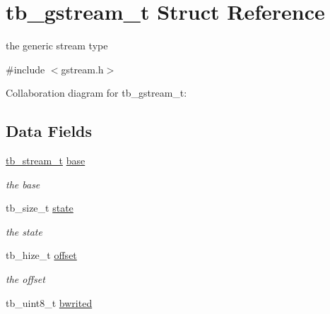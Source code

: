\hypertarget{structtb__gstream__t}{\section{tb\-\_\-gstream\-\_\-t Struct Reference}
\label{structtb__gstream__t}
}


the generic stream type  




{\ttfamily \#include $<$gstream.\-h$>$}



Collaboration diagram for tb\-\_\-gstream\-\_\-t\-:
\subsection*{Data Fields}
\begin{DoxyCompactItemize}
\item 
\hypertarget{structtb__gstream__t_a7da52e3f128e13ef5c83b011913e1a86}{\hyperlink{structtb__stream__t}{tb\-\_\-stream\-\_\-t} \hyperlink{structtb__gstream__t_a7da52e3f128e13ef5c83b011913e1a86}{base}}\label{structtb__gstream__t_a7da52e3f128e13ef5c83b011913e1a86}

\begin{DoxyCompactList}\small\item\em the base \end{DoxyCompactList}\item 
\hypertarget{structtb__gstream__t_af60ad8b3914ca624c2b2b7246fd3e978}{tb\-\_\-size\-\_\-t \hyperlink{structtb__gstream__t_af60ad8b3914ca624c2b2b7246fd3e978}{state}}\label{structtb__gstream__t_af60ad8b3914ca624c2b2b7246fd3e978}

\begin{DoxyCompactList}\small\item\em the state \end{DoxyCompactList}\item 
\hypertarget{structtb__gstream__t_aafb9f870fb1d25ae501f72e5447ca18b}{tb\-\_\-hize\-\_\-t \hyperlink{structtb__gstream__t_aafb9f870fb1d25ae501f72e5447ca18b}{offset}}\label{structtb__gstream__t_aafb9f870fb1d25ae501f72e5447ca18b}

\begin{DoxyCompactList}\small\item\em the offset \end{DoxyCompactList}\item 
\hypertarget{structtb__gstream__t_a5d45b545297498024a5e2932c4775522}{tb\-\_\-uint8\-\_\-t \hyperlink{structtb__gstream__t_a5d45b545297498024a5e2932c4775522}{bwrited}}\label{structtb__gstream__t_a5d45b545297498024a5e2932c4775522}


\end{DoxyCompactItemize}

